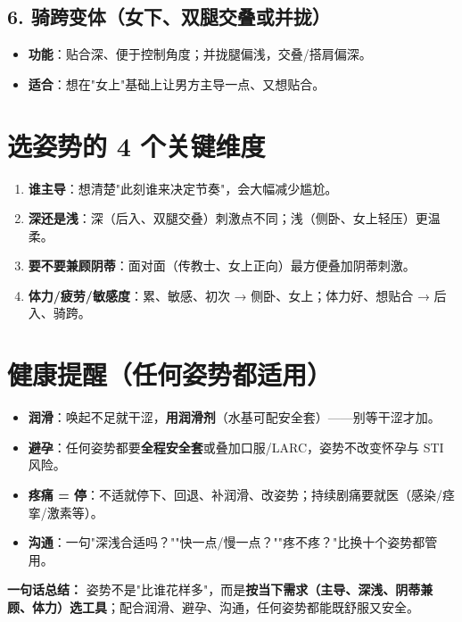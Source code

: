 \documentclass[12pt,UTF8,openany]{ctexbook}
\begin{document}
\subsection*{6. 骑跨变体（女下、双腿交叠或并拢）}
\begin{itemize}[leftmargin=2em,itemsep=0.3em]
  \item \textbf{功能}：贴合深、便于控制角度；并拢腿偏浅，交叠/搭肩偏深。
  \item \textbf{适合}：想在"女上"基础上让男方主导一点、又想贴合。
\end{itemize}

\section{选姿势的 4 个关键维度}

\begin{enumerate}[leftmargin=2em,itemsep=0.3em]
  \item \textbf{谁主导}：想清楚"此刻谁来决定节奏"，会大幅减少尴尬。
  \item \textbf{深还是浅}：深（后入、双腿交叠）刺激点不同；浅（侧卧、女上轻压）更温柔。
  \item \textbf{要不要兼顾阴蒂}：面对面（传教士、女上正向）最方便叠加阴蒂刺激。
  \item \textbf{体力/疲劳/敏感度}：累、敏感、初次 → 侧卧、女上；体力好、想贴合 → 后入、骑跨。
\end{enumerate}

\section{健康提醒（任何姿势都适用）}

\begin{itemize}[leftmargin=2em,itemsep=0.3em]
  \item \textbf{润滑}：唤起不足就干涩，\textbf{用润滑剂}（水基可配安全套）——别等干涩才加。
  \item \textbf{避孕}：任何姿势都要\textbf{全程安全套}或叠加口服/LARC，姿势不改变怀孕与 STI 风险。
  \item \textbf{疼痛 = 停}：不适就停下、回退、补润滑、改姿势；持续剧痛要就医（感染/痉挛/激素等）。
  \item \textbf{沟通}：一句"深浅合适吗？""快一点/慢一点？""疼不疼？"比换十个姿势都管用。
\end{itemize}

\vspace{1em}
\noindent\textbf{一句话总结：} 姿势不是"比谁花样多"，而是\textbf{按当下需求（主导、深浅、阴蒂兼顾、体力）选工具}；配合润滑、避孕、沟通，任何姿势都能既舒服又安全。
\end{document}
